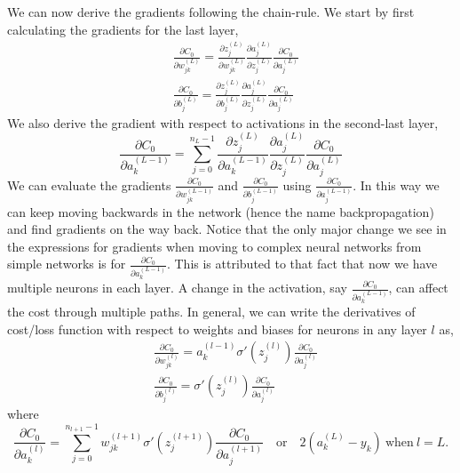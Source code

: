 We can now derive the gradients following the chain-rule. We start by first calculating the gradients for the last layer,
\begin{equation}
    \label{eq:bp_eq_d}
    \begin{aligned}
        &\frac{\partial C_0}{\partial w_{jk}^{(L)}} = \frac{\partial z_j^{(L)}}{\partial w_{jk}^{(L)}} \frac{\partial a_j^{(L)}}{\partial z_j^{(L)}}\frac{\partial C_0}{\partial a_j^{(L)}}\\
        &\frac{\partial C_0}{\partial b_j^{(L)}} = \frac{\partial z_j^{(L)}}{\partial b_j^{(L)}} \frac{\partial a_j^{(L)}}{\partial z_j^{(L)}}\frac{\partial C_0}{\partial a_j^{(L)}}
    \end{aligned}
\end{equation}
We also derive the gradient with respect to activations in the second-last layer,
$$\frac{\partial C_0}{\partial a_k^{(L-1)}} = \sum_{j=0}^{n_{L} -1} \frac{\partial z_j^{(L)}}{\partial a_k^{(L-1)}} \frac{\partial a_j^{(L)}}{\partial z_j^{(L)}}\frac{\partial C_0}{\partial a_j^{(L)}}$$
We can evaluate the gradients $\frac{\partial C_0}{\partial w_{jk}^{(L-1)}}$ and $\frac{\partial C_0}{\partial b_j^{(L-1)}}$ using $\frac{\partial C_0}{\partial a_j^{(L-1)}}$. In this way we can keep moving backwards in the network (hence the name backpropagation)
and find gradients on the way back.  Notice that the only major change we see in the expressions for gradients when moving to complex neural networks from simple networks is for $\frac{\partial C_0}{\partial a_k^{(L-1)}}$. 
This is attributed to that fact that now we have multiple neurons in each layer. A change in the activation, say $\frac{\partial C_0}{\partial a_k^{(L-1)}}$, can affect the cost through multiple paths.
In general, we can write the derivatives of cost/loss function with respect to weights and biases for neurons in any layer $l$ as,
\begin{equation}
    \label{eq:bp_eq}
    \begin{aligned}
        &\frac{\partial C_0}{\partial w_{jk}^{(l)}} = a_k^{(l-1)}\sigma'(z_j^{(l)}) \frac{\partial C_0}{\partial a_j^{(l)}}\\
        &\frac{\partial C_0}{\partial b_j^{(l)}} = \sigma'(z_j^{(l)}) \frac{\partial C_0}{\partial a_j^{(l)}}
    \end{aligned}
\end{equation}
where 
$$\frac{\partial C_0}{\partial a_k^{(l)}} = \sum_{j=0}^{n_{l+1} -1} w_{jk}^{(l+1)} \sigma'(z_j^{(l+1)}) \frac{\partial C_0}{\partial a_j^{(l+1)}} \quad \text{or} \quad  2(a_k^{(L)} - y_k) \ \text{when} \ l=L.$$
